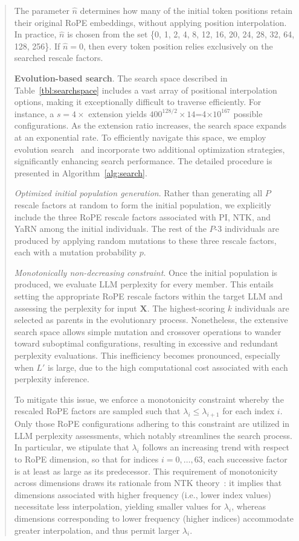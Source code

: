 \begin{abstract}
The parameter $\hat{n}$ determines how many of the initial token positions retain their original RoPE embeddings, without applying position interpolation. In practice, $\hat{n}$ is chosen from the set \{0, 1, 2, 4, 8, 12, 16, 20, 24, 28, 32, 64, 128, 256\}. If $\hat{n}=0$, then every token position relies exclusively on the searched rescale factors.

\textbf{Evolution-based search}. The search space described in Table~\ref{tbl:searchspace} includes a vast array of positional interpolation options, making it exceptionally difficult to traverse efficiently. For instance, a $s=4\times$ extension yields $400^{128/2}\times14$=4$\times10^{167}$ possible configurations. As the extension ratio increases, the search space expands at an exponential rate. To efficiently navigate this space, we employ evolution search~\cite{guo2020single} and incorporate two additional optimization strategies, significantly enhancing search performance. The detailed procedure is presented in Algorithm~\ref{alg:search}.

\textit{Optimized initial population generation}. Rather than generating all $P$ rescale factors at random to form the initial population, we explicitly include the three RoPE rescale factors associated with PI, NTK, and YaRN among the initial individuals. The rest of the $P$-3 individuals are produced by applying random mutations to these three rescale factors, each with a mutation probability $p$.

\textit{Monotonically non-decreasing constraint}. Once the initial population is produced, we evaluate LLM perplexity for every member. This entails setting the appropriate RoPE rescale factors within the target LLM and assessing the perplexity for input $\mathbf{X}$. The highest-scoring $k$ individuals are selected as parents in the evolutionary process. Nonetheless, the extensive search space allows simple mutation and crossover operations to wander toward suboptimal configurations, resulting in excessive and redundant perplexity evaluations. This inefficiency becomes pronounced, especially when $L'$ is large, due to the high computational cost associated with each perplexity inference.

To mitigate this issue, we enforce a monotonicity constraint whereby the rescaled RoPE factors are sampled such that $\lambda_i \leq \lambda_{i+1}$ for each index $i$. Only those RoPE configurations adhering to this constraint are utilized in LLM perplexity assessments, which notably streamlines the search process. In particular, we stipulate that $\lambda_i$ follows an increasing trend with respect to RoPE dimension, so that for indices $i=0,\ldots,63$, each successive factor is at least as large as its predecessor. This requirement of monotonicity across dimensions draws its rationale from NTK theory~\cite{jacot2018neural,tancik2020fourier,ntk}: it implies that dimensions associated with higher frequency (i.e., lower index values) necessitate less interpolation, yielding smaller values for $\lambda_i$, whereas dimensions corresponding to lower frequency (higher indices) accommodate greater interpolation, and thus permit larger $\lambda_i$.


\end{abstract}

